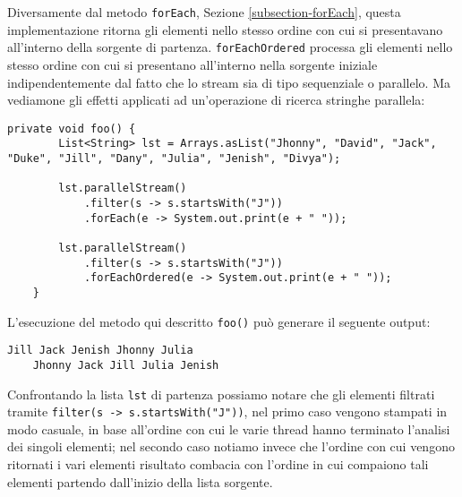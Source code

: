 			Diversamente dal metodo \lstinline|forEach|, Sezione \ref{subsection-forEach}, questa implementazione ritorna gli elementi nello stesso ordine con cui si presentavano all'interno della sorgente di partenza. \lstinline|forEachOrdered| processa gli elementi nello stesso ordine con cui si presentano all'interno nella sorgente iniziale indipendentemente dal fatto che lo stream sia di tipo sequenziale o parallelo. Ma vediamone gli effetti applicati ad un'operazione di ricerca stringhe parallela:
			\begin{lstlisting}[breaklines=true]
	private void foo() {
		List<String> lst = Arrays.asList("Jhonny", "David", "Jack", "Duke", "Jill", "Dany", "Julia", "Jenish", "Divya");
			
		lst.parallelStream()
			.filter(s -> s.startsWith("J"))
			.forEach(e -> System.out.print(e + " "));
		
		lst.parallelStream()
			.filter(s -> s.startsWith("J"))
			.forEachOrdered(e -> System.out.print(e + " "));
	}
			\end{lstlisting}
			L'esecuzione del metodo qui descritto \lstinline|foo()| può generare il seguente output:
			\begin{lstlisting}[numbers=none,frame=none]
	Jill Jack Jenish Jhonny Julia 
	Jhonny Jack Jill Julia Jenish 
			\end{lstlisting}
			Confrontando la lista \lstinline|lst| di partenza possiamo notare che gli elementi filtrati tramite \lstinline|filter(s -> s.startsWith("J"))|, nel primo caso vengono stampati in modo casuale, in base all'ordine con cui le varie thread hanno terminato l'analisi dei singoli elementi; nel secondo caso notiamo invece che l'ordine con cui vengono ritornati i vari elementi risultato combacia con l'ordine in cui compaiono tali elementi partendo dall'inizio della lista sorgente. 
			
